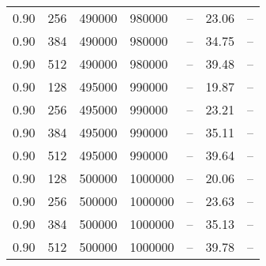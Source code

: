 \begin{tabular}{l|l|l|l|l|l|l}
0.90 & 256 & 490000 & 980000 & -- & 23.06 & --\\
0.90 & 384 & 490000 & 980000 & -- & 34.75 & --\\
0.90 & 512 & 490000 & 980000 & -- & 39.48 & --\\
0.90 & 128 & 495000 & 990000 & -- & 19.87 & --\\
0.90 & 256 & 495000 & 990000 & -- & 23.21 & --\\
0.90 & 384 & 495000 & 990000 & -- & 35.11 & --\\
0.90 & 512 & 495000 & 990000 & -- & 39.64 & --\\
0.90 & 128 & 500000 & 1000000 & -- & 20.06 & --\\
0.90 & 256 & 500000 & 1000000 & -- & 23.63 & --\\
0.90 & 384 & 500000 & 1000000 & -- & 35.13 & --\\
0.90 & 512 & 500000 & 1000000 & -- & 39.78 & --\\
\hline\end{tabular}
